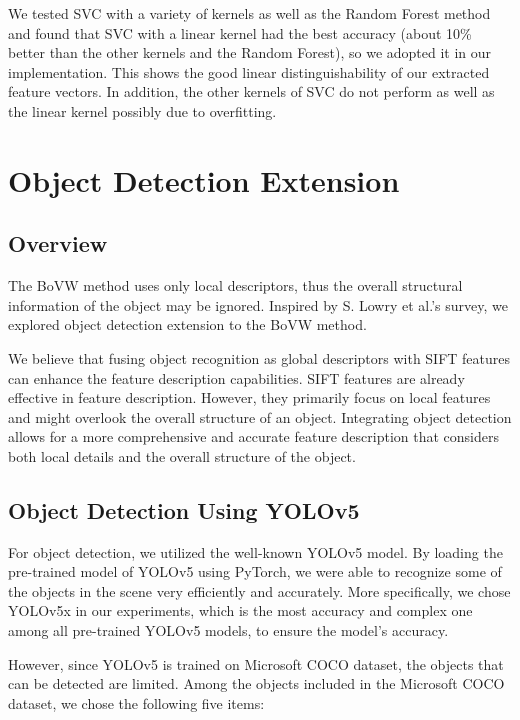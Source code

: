 \documentclass[conference]{IEEEtran}
\begin{document}
We tested SVC with a variety of kernels as well as the Random Forest method and found that SVC with a linear kernel had the best accuracy (about 10\% better than the other kernels and the Random Forest), so we adopted it in our implementation. This shows the good linear distinguishability of our extracted feature vectors. In addition, the other kernels of SVC do not perform as well as the linear kernel possibly due to overfitting.

\section{Object Detection Extension}

\subsection{Overview}

The BoVW method uses only local descriptors, thus the overall structural information of the object may be ignored. Inspired by S. Lowry et al.\cite{lowry2015visual}'s survey, we explored object detection extension to the BoVW method.

We believe that fusing object recognition as global descriptors with SIFT features can enhance the feature description capabilities. SIFT features are already effective in feature description. However, they primarily focus on local features and might overlook the overall structure of an object. Integrating object detection allows for a more comprehensive and accurate feature description that considers both local details and the overall structure of the object.

\subsection{Object Detection Using YOLOv5}

For object detection, we utilized the well-known YOLOv5 model. By loading the pre-trained model of YOLOv5 using PyTorch, we were able to recognize some of the objects in the scene very efficiently and accurately. More specifically, we chose YOLOv5x in our experiments, which is the most accuracy and complex one among all pre-trained YOLOv5 models, to ensure the model's accuracy.

However, since YOLOv5 is trained on Microsoft COCO\cite{lin2014microsoft} dataset, the objects that can be detected are limited. Among the objects included in the Microsoft COCO dataset, we chose the following five items:
\end{document}
